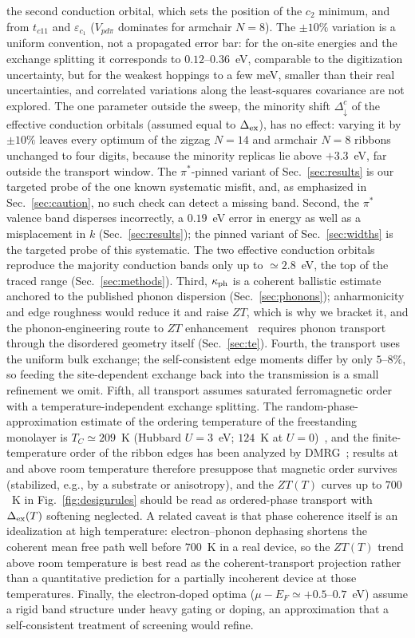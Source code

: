 \documentclass[preprint,12pt]{elsarticle}
\begin{document}
the second conduction orbital, which sets the position of the $c_2$ minimum, and from
$t_{c11}$ and $\varepsilon_{c_1}$ ($V_{pd\pi}$ dominates for armchair $N=8$). The $\pm10\%$
variation is a uniform convention, not a propagated error bar: for the on-site energies and
the exchange splitting it corresponds to $0.12$--$0.36$~eV, comparable to the digitization
uncertainty, but for the weakest hoppings to a few meV, smaller than their real
uncertainties, and correlated variations along the least-squares covariance are not
explored.
The one parameter outside the sweep, the minority shift $\Delta^c_\downarrow$ of the effective
conduction orbitals (assumed equal to $\Delta_{\rm ex}$), has no effect: varying it by $\pm10\%$
leaves every optimum of the zigzag $N=14$ and armchair $N=8$ ribbons unchanged to four digits,
because the minority replicas lie above $+3.3$~eV, far outside the transport window.
The $\pi^*$-pinned variant of Sec.~\ref{sec:results} is our targeted probe of the one known
systematic misfit, and, as emphasized in Sec.~\ref{sec:caution}, no such check can detect a
missing band. Second, the $\pi^*$ valence band disperses incorrectly, a $0.19$~eV error in
energy as well as a misplacement in $k$ (Sec.~\ref{sec:results}); the pinned variant of
Sec.~\ref{sec:widths} is the targeted probe of this systematic. The two effective conduction
orbitals reproduce the majority conduction bands only up to $\simeq2.8$~eV, the top of the
traced range (Sec.~\ref{sec:methods}). Third, $\kappa_{\rm ph}$ is a coherent ballistic estimate
anchored to the published phonon dispersion (Sec.~\ref{sec:phonons}); anharmonicity and edge
roughness would reduce it and raise $ZT$, which is why we bracket it, and the
phonon-engineering route to $ZT$ enhancement~\cite{Sevincli2010} requires phonon transport
through the disordered geometry itself (Sec.~\ref{sec:te}). Fourth, the transport uses the uniform bulk exchange; the self-consistent edge moments differ
by only $5$--$8\%$, so feeding the site-dependent exchange back into the transmission is a
small refinement we omit. Fifth, all transport assumes saturated ferromagnetic order
with a temperature-independent exchange splitting. The random-phase-approximation estimate of
the ordering temperature of the freestanding monolayer is $T_C\simeq209$~K (Hubbard $U=3$~eV;
$124$~K at $U=0$)~\cite{Modarresi2019}, and the finite-temperature order of the ribbon edges
has been analyzed by DMRG~\cite{CrNdmrg2023}; results at and above room temperature therefore
presuppose that magnetic order survives (stabilized, e.g., by a substrate or anisotropy), and
the $ZT(T)$ curves up to $700$~K in Fig.~\ref{fig:designrules} should be read as
ordered-phase transport with $\Delta_{\rm ex}(T)$ softening neglected. A related caveat is
that phase coherence itself is an idealization at high temperature: electron--phonon
dephasing shortens the coherent mean free path well before $700$~K in a real device, so the
$ZT(T)$ trend above room temperature is best read as the coherent-transport projection rather
than a quantitative prediction for a partially incoherent device at those temperatures.
Finally, the electron-doped optima ($\mu-E_F\simeq+0.5$--$0.7$~eV) assume a rigid band
structure under heavy gating or doping, an approximation that a self-consistent treatment of
screening would refine.
\end{document}
